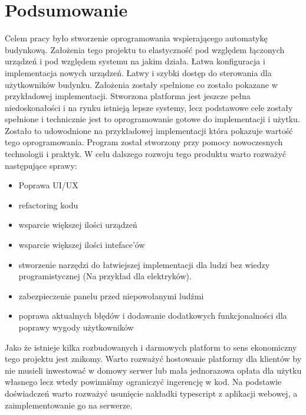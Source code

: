 \chapter{Podsumowanie}
\label{chap:podsumowanie}
Celem pracy było stworzenie oprogramowania wspierającego automatykę budynkową. Założenia tego projektu to elastyczność pod względem łączonych urządzeń i pod względem systemu na jakim działa. 
Łatwa konfiguracja i implementacja nowych urządzeń.
Łatwy i szybki dostęp do sterowania dla użytkowników budynku.
Założenia zostały spełnione co zostało pokazane w przykładowej implementacji.
\newline
Stworzona platforma jest jeszcze pełna niedoskonałości i na rynku istnieją lepsze systemy, lecz podstawowe cele zostały spełnione i technicznie jest to oprogramowanie gotowe do implementacji i użytku. Zostało to udowodnione na przykładowej implementacji która pokazuje wartość tego oprogramowania. Program został stworzony przy pomocy nowoczesnych technologii i praktyk. W celu dalszego rozwoju tego produktu warto rozważyć następujące sprawy:
\begin{itemize}
    \item Poprawa UI/UX
    \item refactoring kodu
    \item wsparcie większej ilości urządzeń
    \item wsparcie większej ilości inteface'ów
    \item stworzenie narzędzi do łatwiejszej implementacji dla ludzi bez wiedzy programistycznej (Na przykład dla elektryków).
    \item zabezpieczenie panelu przed niepowołanymi ludźmi
    \item poprawa aktualnych błędów i dodawanie dodatkowych funkcjonalności dla poprawy wygody użytkowników
\end{itemize}
Jako że istnieje kilka rozbudowanych i darmowych platform to sens ekonomiczny tego projektu jest znikomy. Warto rozważyć hostowanie platformy dla klientów by nie musieli inwestować w domowy serwer lub mała jednorazowa opłata dla użytku własnego lecz wtedy powinniśmy ograniczyć ingerencję w kod. Na podstawie doświadczeń warto rozważyć usunięcie nakładki typescript z aplikacji webowej, a zaimplementowanie go na serwerze. 